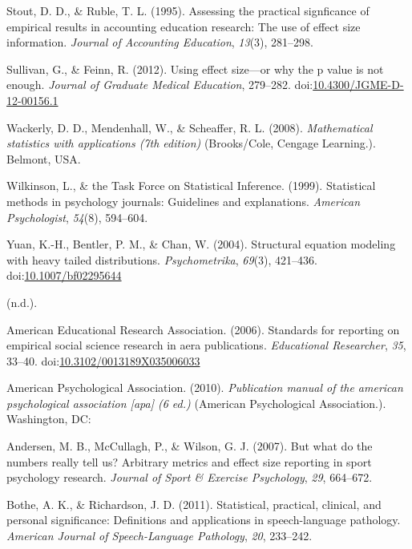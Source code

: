 \documentclass[
  man]{apa6}
\begin{document}
\leavevmode\hypertarget{ref-Stout_Ruble_1995}{}%
Stout, D. D., \& Ruble, T. L. (1995). Assessing the practical signficance of empirical results in accounting education research: The use of effect size information. \emph{Journal of Accounting Education}, \emph{13}(3), 281--298.

\leavevmode\hypertarget{ref-Sullivan_Feinn_2012}{}%
Sullivan, G., \& Feinn, R. (2012). Using effect size---or why the p value is not enough. \emph{Journal of Graduate Medical Education}, 279--282. doi:\href{https://doi.org/10.4300/JGME-D-12-00156.1}{10.4300/JGME-D-12-00156.1}

\leavevmode\hypertarget{ref-Wackerly_et_al_2008}{}%
Wackerly, D. D., Mendenhall, W., \& Scheaffer, R. L. (2008). \emph{Mathematical statistics with applications (7th edition)} (Brooks/Cole, Cengage Learning.). Belmont, USA.

\leavevmode\hypertarget{ref-Wilkinson_1999}{}%
Wilkinson, L., \& the Task Force on Statistical Inference. (1999). Statistical methods in psychology journals: Guidelines and explanations. \emph{American Psychologist}, \emph{54}(8), 594--604.

\leavevmode\hypertarget{ref-Yuan_et_al_2004}{}%
Yuan, K.-H., Bentler, P. M., \& Chan, W. (2004). Structural equation modeling with heavy tailed distributions. \emph{Psychometrika}, \emph{69}(3), 421--436. doi:\href{https://doi.org/10.1007/bf02295644}{10.1007/bf02295644}

\leavevmode\hypertarget{ref-Keselman_et_al_2008}{}%
(n.d.).

\leavevmode\hypertarget{ref-AERA_2006}{}%
American Educational Research Association. (2006). Standards for reporting on empirical social science research in aera publications. \emph{Educational Researcher}, \emph{35}, 33--40. doi:\href{https://doi.org/10.3102/0013189X035006033}{10.3102/0013189X035006033}

\leavevmode\hypertarget{ref-APA_2010}{}%
American Psychological Association. (2010). \emph{Publication manual of the american psychological association {[}apa{]} (6 ed.)} (American Psychological Association.). Washington, DC:

\leavevmode\hypertarget{ref-Andersen_et_al_2007}{}%
Andersen, M. B., McCullagh, P., \& Wilson, G. J. (2007). But what do the numbers really tell us? Arbitrary metrics and effect size reporting in sport psychology research. \emph{Journal of Sport \& Exercise Psychology}, \emph{29}, 664--672.

\leavevmode\hypertarget{ref-Bothe_Richardson_2011}{}%
Bothe, A. K., \& Richardson, J. D. (2011). Statistical, practical, clinical, and personal significance: Definitions and applications in speech-language pathology. \emph{American Journal of Speech-Language Pathology}, \emph{20}, 233--242.
\end{document}
